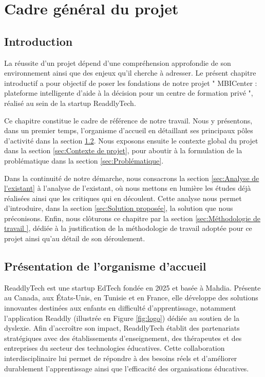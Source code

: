 \chapter{Cadre général du projet} 
 \minitoc
 \newpage
{}
 
\section{Introduction}
La réussite d'un projet dépend d'une compréhension approfondie de son environnement ainsi que des enjeux qu'il cherche à adresser. Le présent chapitre introductif a pour objectif de poser les fondations de notre projet " MBICenter : plateforme intelligente d’aide à la décision pour un centre de formation privé ", réalisé au sein de la startup ReaddlyTech.

Ce chapitre constitue le cadre de référence de notre travail. Nous y présentons, dans un premier temps, l'organisme d'accueil en détaillant ses principaux pôles d'activité dans la section \ref{sec: Présentation de l'organisme d'accueil}. Nous exposons ensuite le contexte global du projet dans la section \ref{sec:Contexte de projet}, pour aboutir à la formulation de la problématique dans la section \ref{sec:Problématique}.

Dans la continuité de notre démarche, nous consacrons la section \ref{sec:Analyse de l'existant} à l'analyse de l'existant, où nous mettons en lumière les études déjà réalisées ainsi que les critiques qui en découlent. Cette analyse nous permet d'introduire, dans la section \ref{sec:Solution proposée}, la solution que nous préconisons. Enfin, nous clôturons ce chapitre par la section \ref{sec:Méthodologie de travail }, dédiée à la justification de la méthodologie de travail adoptée pour ce projet ainsi qu'au détail de son déroulement.
\section{Présentation de l'organisme d'accueil}
\label{sec: Présentation de l'organisme d'accueil}
ReaddlyTech est une startup EdTech fondée en 2025 et basée à Mahdia. Présente au Canada, aux États-Unis, en Tunisie et en France, elle développe des solutions innovantes destinées aux enfants en difficulté d’apprentissage, notamment l’application Readdly (illustrée en Figure \ref{fig:logo}) dédiée au soutien de la dyslexie. Afin d’accroître son impact, ReaddlyTech établit des partenariats stratégiques avec des établissements d’enseignement, des thérapeutes et des entreprises du secteur des technologies éducatives. Cette collaboration interdisciplinaire lui permet de répondre à des besoins réels et d’améliorer durablement l’apprentissage ainsi que l’efficacité des organisations éducatives.

